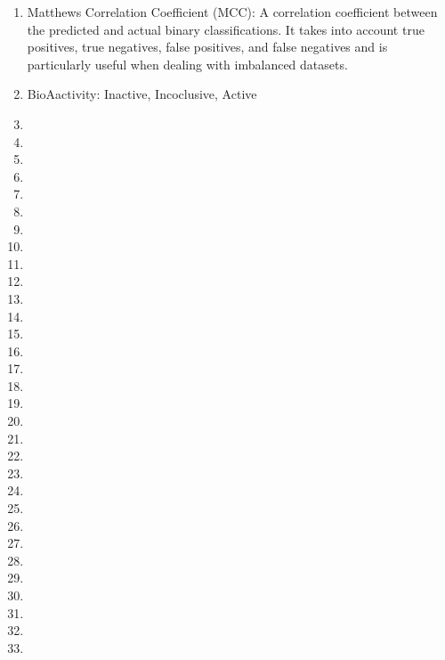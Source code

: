 \begin{enumerate}
    \item Matthews Correlation Coefficient (MCC): A correlation coefficient between the predicted and actual binary classifications. It takes into account true positives, true negatives, false positives, and false negatives and is particularly useful when dealing with imbalanced datasets.
    \item BioAactivity: Inactive, Incoclusive, Active
    \item
    \item
    \item
    \item
    \item
    \item
    \item
    \item
    \item
    \item
    \item
    \item
    \item
    \item
    \item
    \item
    \item
    \item
    \item
    \item
    \item
    \item
    \item
    \item
    \item
    \item
    \item
    \item
    \item
    \item
    \item
\end{enumerate}
